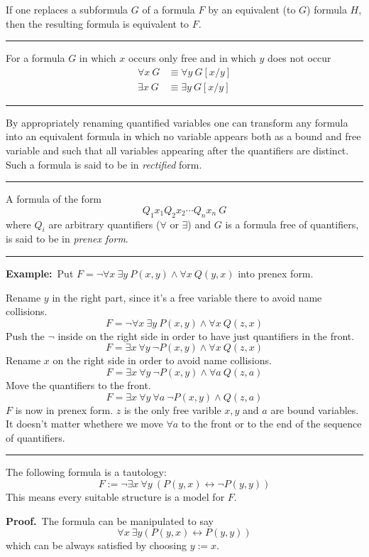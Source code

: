 \documentclass[a4paper]{extarticle}
\newcommand{\Proof}{\textbf{Proof.}\ }
\newcommand{\Ex}{\textbf{Example:}\ }
\newcommand{\sep}{\vspace{5pt}\noindent\hrule\vspace{5pt}}
\begin{document}
\begin{multicols*}{2}
\Lem If one replaces a subformula $G$ of a formula $F$ by an equivalent (to $G$)
formula $H$, then the resulting formula is equivalent to $F$.

\sep

\Lem For a formula $G$ in which $x$ occurs only free and in which $y$ does not
occur
\begin{align*}
\forall x \ G &\equiv \forall y \ G[x/y]\\
\exists x \ G &\equiv \exists y \ G[x/y]
\end{align*}

\sep

 By appropriately renaming quantified variables one can
transform any formula into an equivalent formula in which no variable appears
both as a bound and free variable and such that all variables appearing after
the quantifiers are distinct. Such a formula is said to be in \emph{rectified}
form.

\sep

 A formula of the form
\[
Q_1x_1Q_2x_2\cdots Q_nx_n \ G
\]
where $Q_i$ are arbitrary quantifiers ($\forall$ or $\exists$) and $G$ is a
formula free of quantifiers, is said to be in \emph{prenex form}.

\sep

\Ex Put $F=\lnot \forall x  \ \exists y \ P(x,y) \land \forall x \ Q(y,x)$ into
prenex form.

Rename $y$ in the right part, since it's a free variable there to avoid name
collisions.
\[
F=\lnot \forall x  \ \exists y \ P(x,y) \land \forall x \ Q(z,x)
\]
Push the $\lnot$ inside on the right side in order to have just quantifiers in
the front.
\[
F=\exists x  \ \forall y \ \lnot P(x,y) \land \forall x \ Q(z,x)
\]
Rename $x$ on the right side in order to avoid name collisions.
\[
F=\exists x  \ \forall y \ \lnot P(x,y) \land \forall a \ Q(z,a)
\]
Move the quantifiers to the front.
\[
F=\exists x  \ \forall y \ \forall a \ \lnot P(x,y) \land Q(z,a)
\]
$F$ is now in prenex form. $z$ is the only free varible $x,y$ and $a$ are bound
variables. It doesn't matter whethere we move $\forall a$ to the front or to the
end of the sequence of quantifiers.


\sep

\Thm The following formula is a tautology:
\[
F:=\lnot \exists x \ \forall y \ (P(y,x)\leftrightarrow\lnot P(y,y))
\]
This means every suitable structure is a model for $F$.

\Proof The formula can be manipulated to say 
\[
\forall x \ \exists y (P(y,x)\leftrightarrow P(y,y) )
\]
which can be always satisfied by choosing $y:=x$.


\end{multicols*}
\end{document}
